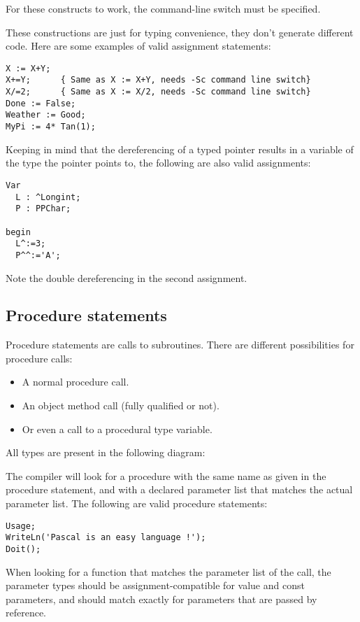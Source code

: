 For these constructs to work, the  command-line switch must
be specified.

\begin{remark}
These constructions are just for typing convenience, they
don't generate different code.
Here are some examples of valid assignment statements:
\begin{verbatim}
X := X+Y;
X+=Y;      { Same as X := X+Y, needs -Sc command line switch}
X/=2;      { Same as X := X/2, needs -Sc command line switch}
Done := False;
Weather := Good;
MyPi := 4* Tan(1);
\end{verbatim}
\end{remark}

Keeping in mind that the dereferencing of a typed pointer results
in a variable of the type the pointer points to, the following are
also valid assignments:
\begin{verbatim}
Var
  L : ^Longint;
  P : PPChar; 

begin
  L^:=3;
  P^^:='A';
\end{verbatim}
Note the double dereferencing in the second assignment.
\subsection{Procedure statements}
Procedure statements are calls to subroutines. There are
different possibilities for procedure calls: 
\begin{itemize}
\item A normal procedure call.
\item An object method call (fully qualified or not).
\item Or even a call to a procedural type variable.
\end{itemize} 
All types are present in the following diagram:

The \fpc compiler will look for a procedure with the same name as given in
the procedure statement, and with a declared parameter list that matches the
actual parameter list.
The following are valid procedure statements:
\begin{verbatim}
Usage;
WriteLn('Pascal is an easy language !');
Doit();
\end{verbatim}
\begin{remark}
When looking for a function that matches the parameter list of the call, 
the parameter types should be assignment-compatible for value and const
parameters, and should match exactly for parameters that are passed by
reference.
\end{remark}

